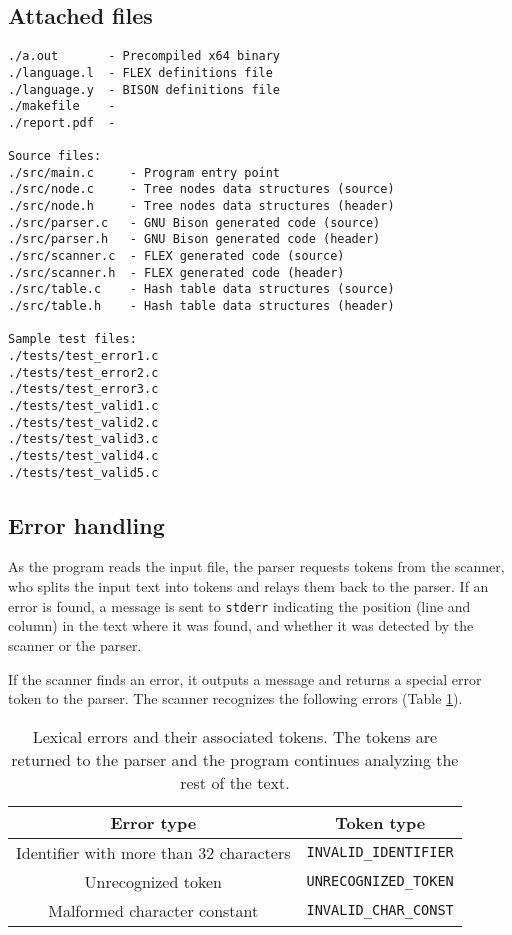 \documentclass[12pt]{article}
\begin{document}
\subsection{Attached files}
\begin{lstlisting}
./a.out       - Precompiled x64 binary
./language.l  - FLEX definitions file
./language.y  - BISON definitions file
./makefile    - 
./report.pdf  - 

Source files:
./src/main.c     - Program entry point
./src/node.c     - Tree nodes data structures (source)
./src/node.h     - Tree nodes data structures (header)
./src/parser.c   - GNU Bison generated code (source)
./src/parser.h   - GNU Bison generated code (header)
./src/scanner.c  - FLEX generated code (source)
./src/scanner.h  - FLEX generated code (header)
./src/table.c    - Hash table data structures (source)
./src/table.h    - Hash table data structures (header)

Sample test files:
./tests/test_error1.c
./tests/test_error2.c
./tests/test_error3.c
./tests/test_valid1.c
./tests/test_valid2.c
./tests/test_valid3.c
./tests/test_valid4.c
./tests/test_valid5.c
\end{lstlisting}


\subsection{Error handling}
As the program reads the input file, the parser requests tokens from the scanner, who splits the
input text into tokens and relays them back to the parser. If an error is found, a message is
sent to \texttt{stderr} indicating the position (line and column) in the text where it was found,
and whether it was detected by the scanner or the parser.

If the scanner finds an error, it outputs a message and returns a special error token to the parser.
The scanner recognizes the following errors (Table \ref{tab:scanner-errors}).

\begin{table}[h]
\centering
\captionsetup{width=0.7\textwidth}
\caption{Lexical errors and their associated tokens. The tokens are returned
to the parser and the program continues analyzing the rest of the text.}
\label{tab:scanner-errors}
\begin{tabular} {c c}
\hline
Error type & Token type \\
\hline
Identifier with more than 32 characters & \texttt{INVALID\_IDENTIFIER} \\
Unrecognized token & \texttt{UNRECOGNIZED\_TOKEN} \\
Malformed character constant & \texttt{INVALID\_CHAR\_CONST} \\
\hline
\end{tabular}

\end{table}
\end{document}
